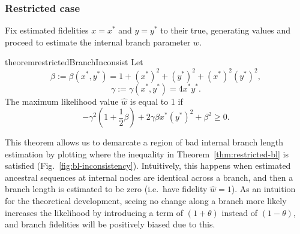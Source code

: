 \documentclass{article}
\begin{document}
\subsubsection*{Restricted case}

Fix estimated fidelities $x=x^*$ and $y=y^*$ to their true, generating values and proceed to estimate the internal branch parameter $w$.
\begin{restatable}{theorem}{restrictedBranchInconsist}
\label{thm:restricted-bl}
Let
$$
\beta := \beta(x^*, y^*) = 1+(x^*)^2+(y^*)^2+(x^*)^2(y^*)^2,
$$
$$
\gamma := \gamma(x^*, y^*) = 4x^*y^*.
$$
The maximum likelihood value $\hat{w}$ is equal to 1 if
$$
-\gamma^2\left(1 + \frac{1}{2}\beta\right) + 2\gamma\beta x^*(y^*)^2 + \beta^2 \ge 0.
$$
\end{restatable}
This theorem allows us to demarcate a region of bad internal branch length estimation by plotting where the inequality in Theorem~\ref{thm:restricted-bl} is satisfied (Fig.~\ref{fig:bl-inconsistency}).
Intuitively, this happens when estimated ancestral sequences at internal nodes are identical across a branch, and then a branch length is estimated to be zero (i.e.\ have fidelity $\hat{w} = 1$).
As an intuition for the theoretical development, seeing no change along a branch more likely increases the likelihood by introducing a term of $(1+\theta)$ instead of $(1-\theta)$, and branch fidelities will be positively biased due to this.
\end{document}
